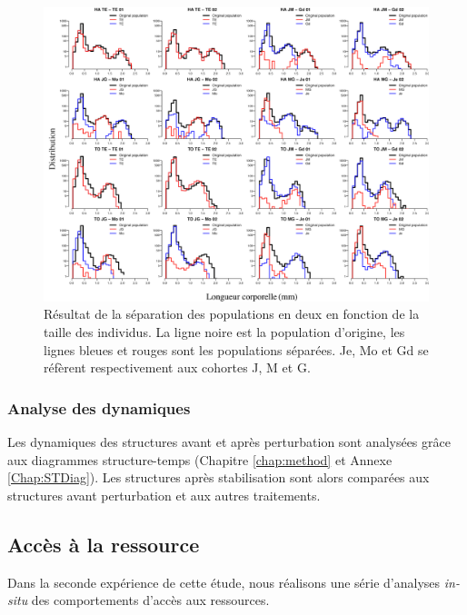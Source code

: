 \begin{figure}[!ht]
\begin{center}
\includegraphics[width=1\textwidth]{1_CorpsDeThese/Resumes/Fig/SM01}
\caption[Séparation des
populations]{Résultat de la séparation des populations en deux en fonction de
la taille des individus. La ligne noire est la population d'origine, les lignes
bleues et rouges sont les populations séparées. Je, Mo et Gd se réfèrent
respectivement aux cohortes J, M et G.}
\label{fig:SM1}
\end{center}
\end{figure}

\subsubsection{Analyse des dynamiques}

Les dynamiques des structures avant et après perturbation sont analysées grâce
aux diagrammes structure-temps (Chapitre \ref{chap:method} et
Annexe \ref{Chap:STDiag}).
Les structures après stabilisation sont alors comparées aux structures avant perturbation et
aux autres traitements. 

\subsection{Accès à la ressource}

Dans la seconde expérience de cette étude, nous réalisons une série d'analyses
\textit{in-situ} des comportements d'accès aux ressources.


